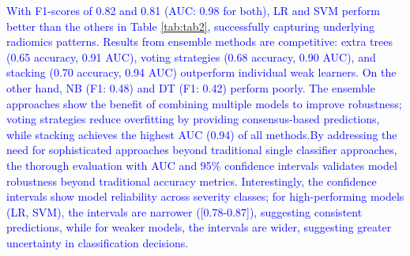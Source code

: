 \documentclass[twocolumn]{article}
\begin{document}
\textcolor{blue}{
With F1-scores of 0.82 and 0.81 (AUC: 0.98 for both), LR and SVM perform better than the others in Table \ref{tab:tab2}, successfully capturing underlying radiomics patterns.  Results from ensemble methods are competitive: extra trees (0.65 accuracy, 0.91 AUC), voting strategies (0.68 accuracy, 0.90 AUC), and stacking (0.70 accuracy, 0.94 AUC) outperform individual weak learners.  On the other hand, NB (F1: 0.48) and DT (F1: 0.42) perform poorly.  The ensemble approaches show the benefit of combining multiple models to improve robustness; voting strategies reduce overfitting by providing consensus-based predictions, while stacking achieves the highest AUC (0.94) of all methods.By addressing the need for sophisticated approaches beyond traditional single classifier approaches, the thorough evaluation with AUC and 95\% confidence intervals validates model robustness beyond traditional accuracy metrics.  Interestingly, the confidence intervals show model reliability across severity classes; for high-performing models (LR, SVM), the intervals are narrower ([0.78-0.87]), suggesting consistent predictions, while for weaker models, the intervals are wider, suggesting greater uncertainty in classification decisions.
}
\end{document}
